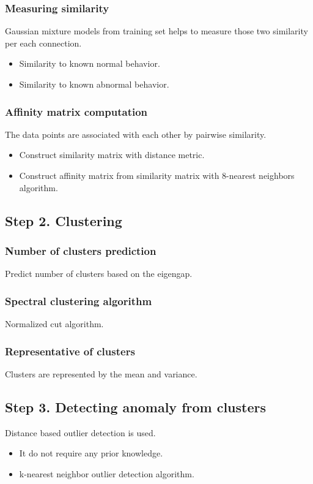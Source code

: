 \subsubsection{Measuring similarity}
Gaussian mixture models from training set helps to measure those two similarity per each connection.
\begin{itemize}
\item Similarity to known normal behavior.
\item Similarity to known abnormal behavior.
\end{itemize}

\subsubsection{Affinity matrix computation}
The data points are associated with each other by pairwise similarity.
\begin{itemize}
\item Construct similarity matrix with distance metric.
\item Construct affinity matrix from similarity matrix with 8-nearest neighbors algorithm.
\end{itemize}

\subsection{Step 2. Clustering}
\subsubsection{Number of clusters prediction}
Predict number of clusters based on the eigengap.
\subsubsection{Spectral clustering algorithm}
Normalized cut algorithm. \cite{jianbo00}
\subsubsection{Representative of clusters}
Clusters are represented by the mean and variance.

\subsection{Step 3. Detecting anomaly from clusters}
Distance based outlier detection is used.
\begin{itemize}
\item It do not require any prior knowledge.
\item k-nearest neighbor outlier detection algorithm. \cite{knorr00}
\end{itemize}

